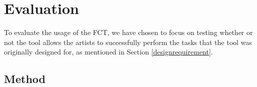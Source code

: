 \section{Evaluation}



To evaluate the usage of the FCT, we have chosen to focus on testing whether or not the tool allows the artists to successfully perform the tasks that the tool was originally designed for, as mentioned in Section \ref{designrequirement}.



\subsection{Method} \label{method}





%
%
%